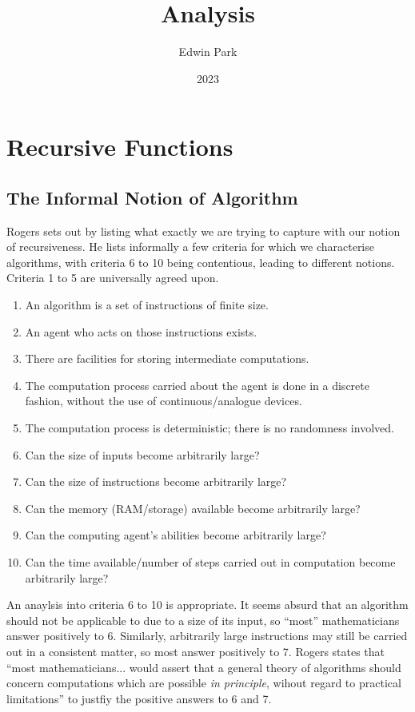 \documentclass{article}
\title{Analysis}
\author{Edwin Park}
\date{2023}
\theoremstyle{definition}
\begin{document}
\clearpage\maketitle\thispagestyle{empty} %
\newpage
\tableofcontents
\newpage\setcounter{page}{1}

\section{Recursive Functions}
\subsection{The Informal Notion of Algorithm}
Rogers sets out by listing what exactly we are trying to capture with our notion of recursiveness. He lists informally a few criteria for which we characterise algorithms, with criteria 6 to 10 being contentious, leading to different notions. Criteria 1 to 5 are universally agreed upon.
\begin{enumerate}
	\item An algorithm is a set of instructions of finite size.
	\item An agent who acts on those instructions exists.
	\item There are facilities for storing intermediate computations.
	\item The computation process carried about the agent is done in a discrete fashion, without the use of continuous/analogue devices.
	\item The computation process is deterministic; there is no randomness involved.
	\item Can the size of inputs become arbitrarily large?
	\item Can the size of instructions become arbitrarily large?
	\item Can the memory (RAM/storage) available become arbitrarily large?
	\item Can the computing agent's abilities become arbitrarily large?
	\item Can the time available/number of steps carried out in computation become arbitrarily large?
\end{enumerate}
An anaylsis into criteria 6 to 10 is appropriate. It seems absurd that an algorithm should not be applicable to due to a size of its input, so ``most'' mathematicians answer positively to 6. Similarly, arbitrarily large instructions may still be carried out in a consistent matter, so most answer positively to 7. Rogers states that ``most mathematicians... would assert that a general theory of algorithms should concern computations which are possible \emph{in principle}, wihout regard to practical limitations'' to justfiy the positive answers to 6 and 7.\par
\end{document}
